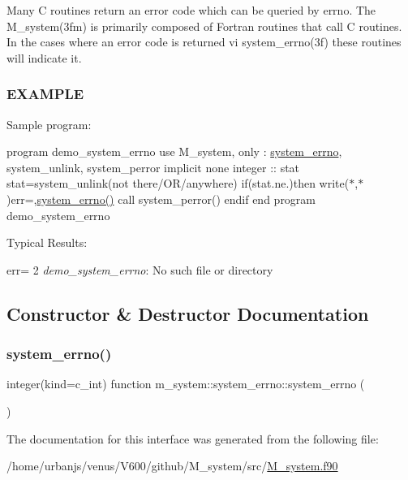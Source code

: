 Many C routines return an error code which can be queried by errno. The M\+\_\+system(3fm) is primarily composed of Fortran routines that call C routines. In the cases where an error code is returned vi system\+\_\+errno(3f) these routines will indicate it.

\subsubsection*{E\+X\+A\+M\+P\+LE}

Sample program\+:

program demo\+\_\+system\+\_\+errno use M\+\_\+system, only \+: \mbox{\hyperlink{interfacem__system_1_1system__errno}{system\+\_\+errno}}, system\+\_\+unlink, system\+\_\+perror implicit none integer \+:\+: stat stat=system\+\_\+unlink(\textquotesingle{}not there/\+O\+R/anywhere\textquotesingle{}) if(stat.\+ne.)then write($\ast$,$\ast$)\textquotesingle{}err=\textquotesingle{},\mbox{\hyperlink{interfacem__system_1_1system__errno_a6450910dca7e89b71a84745d95a52d79}{system\+\_\+errno()}} call system\+\_\+perror(\textquotesingle{}) endif end program demo\+\_\+system\+\_\+errno

Typical Results\+:

err= 2 {\itshape demo\+\_\+system\+\_\+errno}\+: No such file or directory 

\subsection{Constructor \& Destructor Documentation}
\mbox{\label{interfacem__system_1_1system__errno_a6450910dca7e89b71a84745d95a52d79}} 
\subsubsection{\texorpdfstring{system\+\_\+errno()}{system\_errno()}}
{\footnotesize\ttfamily integer(kind=c\+\_\+int) function m\+\_\+system\+::system\+\_\+errno\+::system\+\_\+errno (\begin{DoxyParamCaption}{ }\end{DoxyParamCaption})\hspace{0.3cm}{\ttfamily [private]}}



The documentation for this interface was generated from the following file\+:\begin{DoxyCompactItemize}
\item 
/home/urbanjs/venus/\+V600/github/\+M\+\_\+system/src/\mbox{\hyperlink{M__system_8f90}{M\+\_\+system.\+f90}}\end{DoxyCompactItemize}
